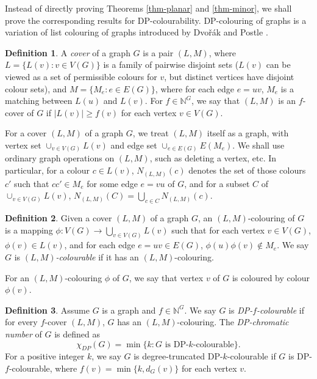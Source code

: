 \documentclass[11pt,a4paper]{article}
\theoremstyle{definition}
\newtheorem{definition}{Definition}
\begin{document}
Instead of directly proving Theorems \ref{thm-planar} and \ref{thm-minor}, we shall prove the corresponding results for DP-colourability.
DP-colouring of graphs is a variation of list colouring of graphs introduced by Dvo\v{r}\'{a}k and Postle \cite{DP}. 

\begin{definition}
	\label{def-cover}
	A {\em  cover} of a graph $G $ is a pair $(L,M)$, where $L = \{L(v): v \in V(G)\}$ is a family of pairwise disjoint sets ($L(v)$ can be viewed as a set of permissible colours for $v$, but distinct vertices have disjoint colour sets), and $M=\{M_{e}: e \in E(G)\}$, where for each edge $e=uv$, $M_e$ is a   matching between $L(u)$ and $L(v)$. For  $f \in \mathbb{N}^G$, we say that $(L,M)$ is an $f$-cover of $G$ if $|L(v)|\ge f(v)$ for each vertex $v \in V(G)$.
\end{definition}

 
 
For a cover $(L,M)$ of a graph $G$, we treat $(L,M)$ itself as a graph, with vertex set $\cup_{v \in V(G)}L(v)$ and edge set
$\cup_{e \in E(G)}E(M_e)$. We shall use ordinary graph operations on $(L,M)$, such as deleting a vertex, etc. In particular, for a colour $c \in L(v)$,    $N_{(L,M)}(c)$ denotes the set of those colours $c'$ such that $cc' \in M_e$ for some edge $e=vu$ of $G$, and for a subset $C $ of $ \cup_{v \in V(G)}L(v)$, $N_{(L,M)}(C) = \bigcup_{c \in C}N_{(L,M)}(c)$.
 

\begin{definition}
	\label{def-colouring}
	Given a cover $(L,M)$ of a graph $G$, an $(L,M)$-colouring of $G$ is a mapping $\phi: V(G) \to \bigcup_{v \in V(G)}L(v)$ such that for each vertex $v \in V(G)$, $\phi(v) \in L(v)$, and for each edge $e=uv \in E(G)$, $\phi(u)\phi(v) \notin  M_e$. We say $G$ is {\em $(L, M)$-colourable} if it has an $(L,M)$-colouring.
\end{definition}

 For an $(L,M)$-colouring $\phi$ of $G$, we say that vertex $v$ of $G$ is coloured by colour $\phi(v)$.

\begin{definition}
	\label{DP-colouring}
	Assume $G$ is a graph and $f \in  \mathbb{N}^G$.  We say $G$ is {\em DP-$f$-colourable} if for every   $f$-cover $(L,M)$, $G$ has an $(L,M)$-colouring. The {\em  DP-chromatic number } of $G$ is defined as 
 $$\chi_{DP}(G)=\min\{k: G \text{ is DP-$k$-colourable} \}.$$
 For a positive integer $k$, we say $G$ is degree-truncated DP-$k$-colourable if $G$ is DP-$f$-colourable, where $f(v)= \min\{k, d_G(v)\}$ for each vertex $v$.
\end{definition}
\end{document}
